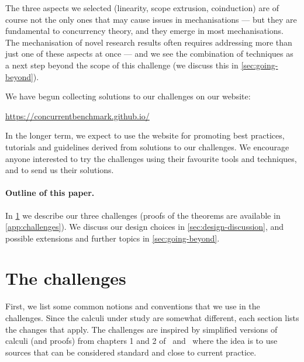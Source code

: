 \documentclass[runningheads]{llncs}
\begin{document}
The three aspects we selected (linearity, scope extrusion, coinduction) are of
course not the only ones that may cause issues in mechanisations --- but they
are fundamental to concurrency theory, and they emerge in most mechanisations.
The mechanisation of novel research results often requires addressing more than
just one of these aspects at once --- and we see the combination of techniques
as a next step beyond the scope of this challenge (we discuss this in
\cref{sec:going-beyond}).


We have begun collecting solutions to our challenges on our website:
%
\begin{center}
  \url{https://concurrentbenchmark.github.io/}
\end{center}
%
In the longer term, we expect to use the website for promoting best practices,
tutorials and guidelines derived from solutions to our challenges.
We encourage anyone interested to try the challenges using their
favourite tools and techniques, and to send us their solutions.

\paragraph{Outline of this paper.}
In \cref{sec:challenge-problems} we describe our three challenges (proofs of the theorems are available in \cref{app:challenges}).
We discuss our design choices in \cref{sec:design-discussion}, and possible extensions and further topics in \cref{sec:going-beyond}.

\section{The challenges}\label{sec:challenge-problems}
\label{sec:prelim}
First, we list some common notions and conventions that we use in the
challenges. Since the calculi under study are somewhat different, each
section lists the changes that apply. The challenges are inspired by
simplified versions of calculi (and proofs) from chapters 1 and 2
of~\cite{picalcbook} and~\cite{Vasconcelos2012} where the idea is to
use sources that can be considered standard and close to current practice.
\end{document}
